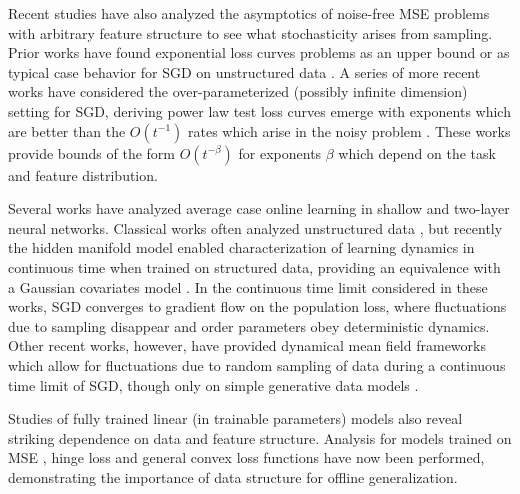 \documentclass{article} %
\begin{document}
Recent studies have also analyzed the asymptotics of noise-free MSE problems with arbitrary feature structure to see what stochasticity arises from sampling. Prior works have found exponential loss curves problems as an upper bound \citep{jain2018accelerating} or as typical case behavior for SGD on unstructured data \citep{Werfel}. A series of more recent works have considered the over-parameterized (possibly infinite dimension) setting for SGD, deriving power law test loss curves emerge with exponents which are better than the $O(t^{-1})$ rates which arise in the noisy problem \citep{berthier2020tight, pillaudvivien2018statistical, dieuleveut, varre2021iterate, dieuleveut_nonparametric, ying_nonparametric, fischer_sobolev, zou2021benign}.  These works provide bounds of the form $O(t^{-\beta})$ for exponents $\beta$ which depend on the task and feature distribution.

Several works have analyzed average case online learning in shallow and two-layer neural networks. Classical works often analyzed unstructured data \citep{heskes,Biehl_1994,Mace1998StatisticalMA, saad_solla,lecun_solla_eigenspectrum_cov,goldt_first}, but recently the hidden manifold model enabled characterization of learning dynamics in continuous time when trained on structured data, providing an equivalence with a Gaussian covariates model \citep{goldt_hidden_manifold, goldt2021gaussian}. In the continuous time limit considered in these works, SGD converges to gradient flow on the population loss, where fluctuations due to sampling disappear and order parameters obey deterministic dynamics. Other recent works, however, have provided dynamical mean field frameworks which allow for fluctuations due to random sampling of data during a continuous time limit of SGD, though only on simple generative data models \citep{mignacco2020dynamical, mignacco2021stochasticity}. 

Studies of fully trained linear (in trainable parameters) models also reveal striking dependence on data and feature structure. Analysis for models trained on MSE \citep{bartlett2020benign, tsigler2020benign, bordelon2020spectrum, Canatar2020SpectralBA}, hinge loss \citep{chatterji2021finite, cao2021risk, cao2019generalization} and general convex loss functions \citep{loureiro2021capturing} have now been performed, demonstrating the importance of data structure for offline generalization.
\end{document}
